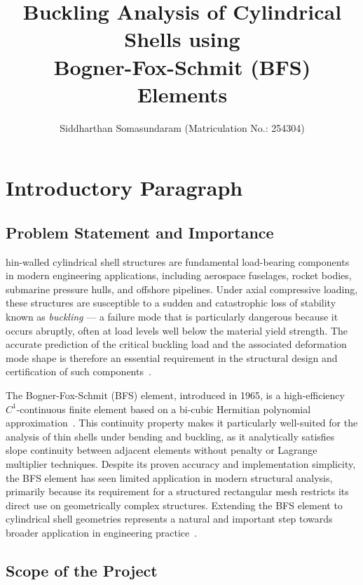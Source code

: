 \documentclass[9pt,a4paper,twoside]{tau-class/tau}
\title{Buckling Analysis of Cylindrical Shells using\\
Bogner-Fox-Schmit (BFS) Elements}
\author[a,1]{Siddharthan Somasundaram (Matriculation No.: 254304)}
\affil[a]{Otto-von-Guericke-Universit\"{a}t Magdeburg, Germany}
\begin{document}
		
    \maketitle 
    \thispagestyle{firststyle}
    \tauabstract 
    \tableofcontents
    \linenumbers 

\section{Introductory Paragraph}

\subsection{Problem Statement and Importance}

hin-walled cylindrical shell structures are fundamental
load-bearing components in modern engineering applications, including
aerospace fuselages, rocket bodies, submarine pressure hulls, and offshore
pipelines. Under axial compressive loading, these structures are susceptible
to a sudden and catastrophic loss of stability known as \emph{buckling} ---
a failure mode that is particularly dangerous because it occurs abruptly,
often at load levels well below the material yield strength. The accurate
prediction of the critical buckling load and the associated deformation mode
shape is therefore an essential requirement in the structural design and
certification of such components~\cite{timoshenko1961,abaqus2009}.

The Bogner-Fox-Schmit (BFS) element, introduced in 1965, is a
high-efficiency $C^1$-continuous finite element based on a bi-cubic
Hermitian polynomial approximation~\cite{bogner1965}. This continuity
property makes it particularly well-suited for the analysis of thin shells
under bending and buckling, as it analytically satisfies slope continuity
between adjacent elements without penalty or Lagrange multiplier techniques.
Despite its proven accuracy and implementation simplicity, the BFS element
has seen limited application in modern structural analysis, primarily because
its requirement for a structured rectangular mesh restricts its direct use on
geometrically complex structures. Extending the BFS element to cylindrical
shell geometries represents a natural and important step towards broader
application in engineering practice~\cite{eisentraeger2022}.

\subsection{Scope of the Project}
\end{document}
